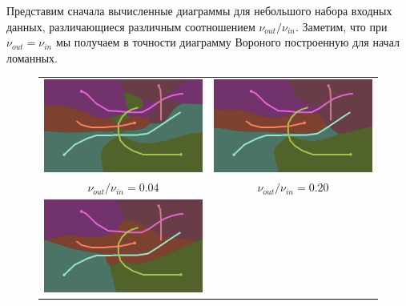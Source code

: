 \documentclass[12pt]{article}
\begin{document}
Представим сначала вычисленные диаграммы для небольшого набора входных данных,
различающиеся различным соотношением $\nu_{out}/\nu_{in}$. Заметим, что при
$\nu_{out} = \nu_{in}$ мы получаем в точности диаграмму Вороного построенную 
для начал ломанных.
\begin{figure}
\label{fig_samples}
\end{figure}

\begin{figure}
\begin{center}
\begin{tabular}{c c}
\includegraphics[scale=0.2]{sample004.png} &
\includegraphics[scale=0.2]{sample020.png} \\
$\nu_{out} / \nu_{in} = 0.04$ & $\nu_{out} / \nu_{in} = 0.20$ \\
\includegraphics[scale=0.2]{sample050.png} &

\end{tabular}
\end{center}
\end{figure}
\end{document}
